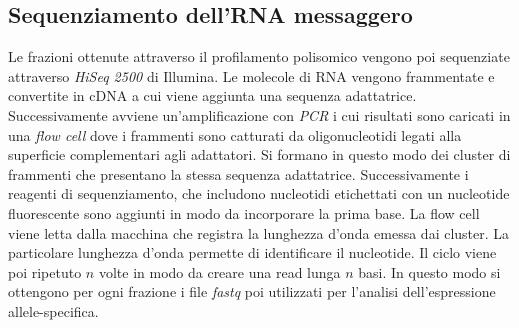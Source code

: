 \subsection{Sequenziamento dell'RNA messaggero}
Le frazioni ottenute attraverso il profilamento polisomico vengono poi sequenziate attraverso \emph{HiSeq 2500} di Illumina.
Le molecole di RNA vengono frammentate e convertite in cDNA a cui viene aggiunta una sequenza adattatrice.
Successivamente avviene un'amplificazione con \emph{PCR} i cui risultati sono caricati in una \emph{flow cell} dove i frammenti sono catturati da oligonucleotidi legati alla superficie complementari agli adattatori.
Si formano in questo modo dei cluster di frammenti che presentano la stessa sequenza adattatrice.
Successivamente i reagenti di sequenziamento, che includono nucleotidi etichettati con un nucleotide fluorescente sono aggiunti in modo da incorporare la prima base.
La flow cell viene letta dalla macchina che registra la lunghezza d'onda emessa dai cluster.
La particolare lunghezza d'onda permette di identificare il nucleotide.
Il ciclo viene poi ripetuto $n$ volte in modo da creare una read lunga $n$ basi.
In questo modo si ottengono per ogni frazione i file \emph{fastq} poi utilizzati per l'analisi dell'espressione allele-specifica.
